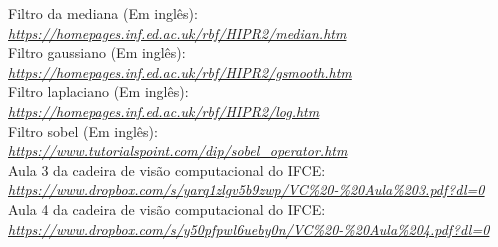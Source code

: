 \documentclass[12pt,fleqn]{article}
\begin{document}
Filtro da mediana (Em inglês): \\
  \href{https://homepages.inf.ed.ac.uk/rbf/HIPR2/median.htm}{\textit{https://homepages.inf.ed.ac.uk/rbf/HIPR2/median.htm}} \\

Filtro gaussiano (Em inglês): \\
  \href{https://homepages.inf.ed.ac.uk/rbf/HIPR2/gsmooth.htm}{\textit{https://homepages.inf.ed.ac.uk/rbf/HIPR2/gsmooth.htm}} \\

Filtro laplaciano (Em inglês): \\
  \href{https://homepages.inf.ed.ac.uk/rbf/HIPR2/log.htm}{\textit{https://homepages.inf.ed.ac.uk/rbf/HIPR2/log.htm}} \\ 

Filtro sobel (Em inglês): \\
  \href{https://www.tutorialspoint.com/dip/sobel_operator.htm}{\textit{https://www.tutorialspoint.com/dip/sobel_operator.htm}} \\ 

Aula 3 da cadeira de visão computacional do IFCE: \\
  \href{https://www.dropbox.com/s/yarq1zlgv5b9zwp/VC%20-%20Aula%203.pdf?dl=0}{\textit{https://www.dropbox.com/s/yarq1zlgv5b9zwp/VC\%20-\%20Aula\%203.pdf?dl=0}} \\

Aula 4 da cadeira de visão computacional do IFCE: \\
  \href{https://www.dropbox.com/s/y50pfpwl6ueby0n/VC%20-%20Aula%204.pdf?dl=0}{\textit{https://www.dropbox.com/s/y50pfpwl6ueby0n/VC\%20-\%20Aula\%204.pdf?dl=0}} \\









\end{document}
